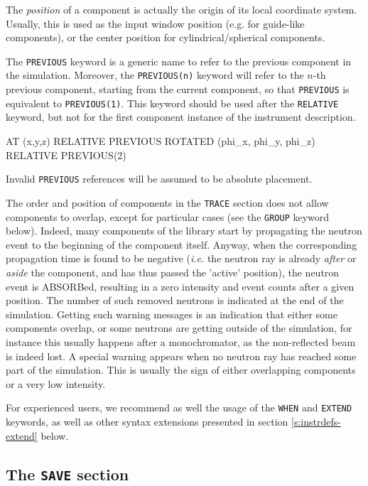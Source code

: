 The \emph{position} of
a component is actually the origin of its local coordinate
system. Usually, this is used as the input window position (e.g. for
guide-like components), or the center position for
cylindrical/spherical components.

The \texttt{PREVIOUS}
keyword is a generic name to
refer to the previous component in the simulation. Moreover, the
\texttt{PREVIOUS(n)} keyword will refer to the $n$-th previous component,
starting from the current component, so that \texttt{PREVIOUS} is equivalent to
\texttt{PREVIOUS(1)}. This keyword should be used after the \texttt{RELATIVE}
keyword, but not for the first component instance of the instrument description.
\begin{mcstas}
AT (x,y,z) RELATIVE PREVIOUS
ROTATED (phi_x, phi_y, phi_z) RELATIVE PREVIOUS(2)
\end{mcstas}
Invalid \texttt{PREVIOUS} references will be assumed to be absolute placement.

The order and position of components in the \texttt{TRACE} section does not
allow components to overlap, except for particular cases (see the \texttt{GROUP}
keyword below).  Indeed, many components of the \MCS library
 start by propagating the neutron event to the
beginning of the component itself.  Anyway, when the corresponding propagation
time is found to be negative (\textit{i.e.} the neutron ray is already \emph{after}
or \emph{aside} the component, and has thus passed the 'active' position), the
neutron event is ABSORBed,
resulting in a zero intensity and event counts after
a given position. The number of such removed neutrons is indicated at the end of
the simulation.  Getting such warning messages is an indication that either some
components overlap, or some neutrons are getting outside of the simulation, for
instance this usually happens after a monochromator, as the non-reflected beam
is indeed lost. A special warning appears when no neutron ray has reached some
part of the simulation. This is usually the sign of either overlapping
components or a very low intensity.

For experienced users, we recommend as well the usage of the \texttt{WHEN} and
\texttt{EXTEND} keywords, as well as other syntax extensions presented in
section \ref{s:instrdefs-extend} below.

\subsection{The \texttt{SAVE} section}
\label{s:save}

